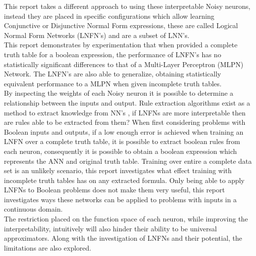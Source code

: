 This report takes a different approach to using these interpretable Noisy neurons, instead they are placed in specific configurations which allow learning Conjunctive or Disjunctive Normal Form expressions, these are called Logical Normal Form Networks (LNFN's) and are a subset of LNN's.\\

This report demonstrates by experimentation that when provided a complete truth table for a boolean expression, the performance of LNFN's has no statistically significant differences to that of a Multi-Layer Perceptron (MLPN) Network. The LNFN's are also able to generalize, obtaining statistically equivalent performance to a MLPN when given incomplete truth tables.\\

By inspecting the weights of each Noisy neuron it is possible to determine a relationship between the inputs and output. Rule extraction algorithms exist as a method to extract knowledge from NN's \cite{andrews1995survey}, if LNFNs are more interpretable then are rules able to be extracted from them? When first considering problems with Boolean inputs and outputs, if a low enough error is achieved when training an LNFN over a complete truth table, it is possible to extract boolean rules from each neuron, consequently it is possible to obtain a boolean expression which represents the ANN and original truth table. Training over entire a complete data set is an unlikely scenario, this report investigates what effect training with incomplete truth tables has on any extracted formula. Only being able to apply LNFNs to Boolean problems does not make them very useful, this report investigates ways these networks can be applied to problems with inputs in a continuous domain.\\

The restriction placed on the function space of each neuron, while improving the interpretability, intuitively will also hinder their ability to be universal approximators. Along with the investigation of LNFNs and their potential, the limitations are also explored.

